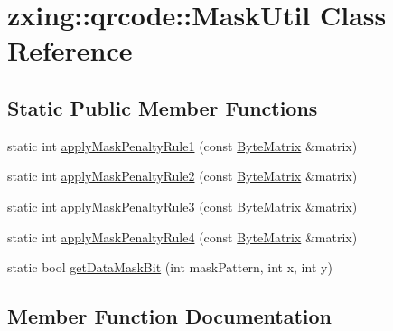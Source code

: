 \hypertarget{classzxing_1_1qrcode_1_1_mask_util}{}\section{zxing\+:\+:qrcode\+:\+:Mask\+Util Class Reference}
\label{classzxing_1_1qrcode_1_1_mask_util}
\subsection*{Static Public Member Functions}
\begin{DoxyCompactItemize}
\item 
static int \mbox{\hyperlink{classzxing_1_1qrcode_1_1_mask_util_aa32c3dfbd0236dc68ef280855a98a6b8}{apply\+Mask\+Penalty\+Rule1}} (const \mbox{\hyperlink{classzxing_1_1qrcode_1_1_byte_matrix}{Byte\+Matrix}} \&matrix)
\item 
static int \mbox{\hyperlink{classzxing_1_1qrcode_1_1_mask_util_ae3fc0a63e7e43c0400cace1f98770d7c}{apply\+Mask\+Penalty\+Rule2}} (const \mbox{\hyperlink{classzxing_1_1qrcode_1_1_byte_matrix}{Byte\+Matrix}} \&matrix)
\item 
static int \mbox{\hyperlink{classzxing_1_1qrcode_1_1_mask_util_abc9c4ac729e26f9d61d8c1ed856477cf}{apply\+Mask\+Penalty\+Rule3}} (const \mbox{\hyperlink{classzxing_1_1qrcode_1_1_byte_matrix}{Byte\+Matrix}} \&matrix)
\item 
static int \mbox{\hyperlink{classzxing_1_1qrcode_1_1_mask_util_a2224bed0a422e85b78c508983ae9db4c}{apply\+Mask\+Penalty\+Rule4}} (const \mbox{\hyperlink{classzxing_1_1qrcode_1_1_byte_matrix}{Byte\+Matrix}} \&matrix)
\item 
static bool \mbox{\hyperlink{classzxing_1_1qrcode_1_1_mask_util_ab094f1548f9bbb715c7227893da58009}{get\+Data\+Mask\+Bit}} (int mask\+Pattern, int x, int y)
\end{DoxyCompactItemize}


\subsection{Member Function Documentation}
\mbox{\label{classzxing_1_1qrcode_1_1_mask_util_aa32c3dfbd0236dc68ef280855a98a6b8}} 
